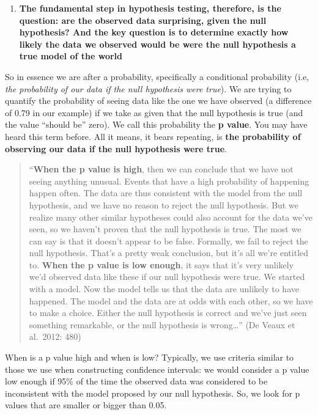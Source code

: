 \documentclass[
]{book}
\providecommand{\tightlist}{%
  \setlength{\itemsep}{0pt}\setlength{\parskip}{0pt}}
\begin{document}
\begin{enumerate}
\def\labelenumi{\arabic{enumi}.}
\setcounter{enumi}{3}
\tightlist
\item
  \textbf{The fundamental step in hypothesis testing, therefore, is the question: are the observed data surprising, given the null hypothesis? And the key question is to determine exactly how likely the data we observed would be were the null hypothesis a true model of the world}
\end{enumerate}

So in essence we are after a probability, specifically a conditional probability (i.e, \emph{the probability of our data if the null hypothesis were true}). We are trying to quantify the probability of seeing data like the one we have observed (a difference of 0.79 in our example) if we take as given that the null hypothesis is true (and the value ``should be'' zero). We call this probability the \textbf{p value}. You may have heard this term before. All it means, it bears repeating, is \textbf{the probability of observing our data if the null hypothesis were true}.

\begin{quote}
``\textbf{When the p value is high}, then we can conclude that we have not seeing anything unusual. Events that have a high probability of happening happen often. The data are thus consistent with the model from the null hypothesis, and we have no reason to reject the null hypothesis. But we realize many other similar hypotheses could also account for the data we've seen, so we haven't proven that the null hypothesis is true. The most we can say is that it doesn't appear to be false. Formally, we fail to reject the null hypothesis. That's a pretty weak conclusion, but it's all we're entitled to. \textbf{When the p value is low enough}, it says that it's very unlikely we'd observed data like these if our null hypothesis were true. We started with a model. Now the model tells us that the data are unlikely to have happened. The model and the data are at odds with each other, so we have to make a choice. Either the null hypothesis is correct and we've just seen something remarkable, or the null hypothesis is wrong\ldots{}'' (De Veaux et al.~2012: 480)
\end{quote}

When is a p value high and when is low? Typically, we use criteria similar to those we use when constructing confidence intervals: we would consider a p value low enough if 95\% of the time the observed data was considered to be inconsistent with the model proposed by our null hypothesis. So, we look for p values that are smaller or bigger than 0.05.
\end{document}
